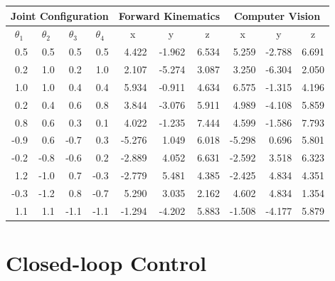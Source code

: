 \documentclass[11pt]{article}
\begin{document}
\begin{center}
    \begin{tabular}{ |r|r|r|r||r|r|r|r|r|r|} \hline
        \multicolumn{4}{|c||}{Joint Configuration} & \multicolumn{3}{|c|}{Forward Kinematics} & \multicolumn{3}{|c|}{Computer Vision} \\ \hline
        \multicolumn{1}{|c|}{$\theta_1$} & \multicolumn{1}{|c|}{$\theta_2$} & \multicolumn{1}{|c|}{$\theta_3$} & \multicolumn{1}{|c||}{$\theta_4$} & \multicolumn{1}{|c|}{x} & \multicolumn{1}{|c|}{y} & \multicolumn{1}{|c|}{z} & \multicolumn{1}{|c|}{x} & \multicolumn{1}{|c|}{y} & \multicolumn{1}{|c|}{z} \\ \hline
         0.5 &  0.5 &  0.5 &  0.5 &  4.422 & -1.962 & 6.534 & 5.259 & -2.788 & 6.691 \\
         0.2 &  1.0 &  0.2 &  1.0 &  2.107 & -5.274 & 3.087 & 3.250 & -6.304 & 2.050 \\
         1.0 &  1.0 &  0.4 &  0.4 &  5.934 & -0.911 & 4.634 & 6.575 & -1.315 & 4.196 \\
         0.2 &  0.4 &  0.6 &  0.8 &  3.844 & -3.076 & 5.911 & 4.989 & -4.108 & 5.859 \\
         0.8 &  0.6 &  0.3 &  0.1 &  4.022 & -1.235 & 7.444 & 4.599 & -1.586 & 7.793 \\
        -0.9 &  0.6 & -0.7 &  0.3 & -5.276 &  1.049 & 6.018 & -5.298 & 0.696 & 5.801 \\
        -0.2 & -0.8 & -0.6 &  0.2 & -2.889 &  4.052 & 6.631 & -2.592 & 3.518 & 6.323 \\
         1.2 & -1.0 &  0.7 & -0.3 & -2.779 &  5.481 & 4.385 & -2.425 & 4.834 & 4.351 \\
        -0.3 & -1.2 &  0.8 & -0.7 &  5.290 &  3.035 & 2.162 & 4.602 & 4.834 & 1.354  \\
         1.1 &  1.1 & -1.1 & -1.1 & -1.294 & -4.202 & 5.883 & -1.508 & -4.177 & 5.879 \\ \hline
    \end{tabular}
\end{center}


\section{Closed-loop Control}
\end{document}
